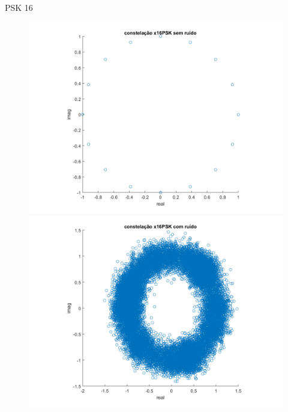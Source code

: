 ﻿\documentclass[mathserif]{beamer}
\begin{document}
	\begin{frame}{PSK 16}
		\begin{figure}
			\centering
			\includegraphics[scale=0.3]{../NossoCodigo2/figuras/modula4.png}
			\includegraphics[scale=0.3]{../NossoCodigo2/figuras/modula10.png}
		\end{figure}
	\end{frame}
\end{document}
